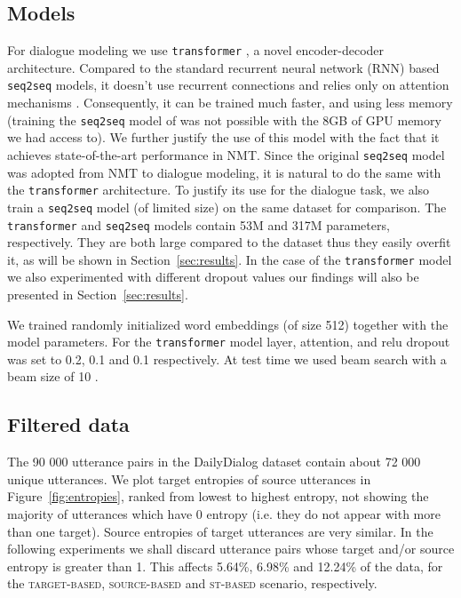 \documentclass[11pt,a4paper]{article}
\begin{document}
\subsection{Models}
For dialogue modeling we use \texttt{transformer} \cite{Vaswani:2017}, a novel
encoder-decoder architecture. Compared to the standard recurrent neural
network (RNN) based \texttt{seq2seq} models, it doesn't use recurrent connections
and relies only on attention mechanisms \cite{Bahdanau:2015}. Consequently, it can
be trained much faster, and using less memory (training the
\texttt{seq2seq}
model of \cite{Vinyals:2015d} was not possible with the 8GB of GPU
memory we had access to). We further justify the use of this model with the fact that it achieves
state-of-the-art performance in NMT. Since the original \texttt{seq2seq} model was
adopted from NMT \cite{Cho:2014} to dialogue modeling,
it is natural to do the same with the \texttt{transformer} architecture.
To justify its use for the dialogue task, we also train a
\texttt{seq2seq} model (of limited size) on the same dataset for comparison.
The \texttt{transformer} and \texttt{seq2seq} models contain 53M and 317M
parameters, respectively. They are both large compared to the dataset thus
they easily overfit it, as will be shown in Section~\ref{sec:results}.
In the case of the \texttt{transformer} model we also experimented with different
dropout \cite{Srivastava:2014a} values our findings will also be
presented in Section~\ref{sec:results}.

We trained randomly initialized word embeddings (of size 512) together with the model parameters. For the \texttt{transformer} model layer, attention, and relu dropout was set to 0.2, 0.1 and 0.1 respectively. At test time we used beam search with a beam size of 10 \cite{Graves:2012b}.

\subsection{Filtered data}
The 90 000 utterance pairs in the DailyDialog dataset contain about 72
000 unique utterances. We plot target entropies of source utterances in
Figure~\ref{fig:entropies}, ranked from lowest to highest entropy, not showing the majority of utterances which have 0 entropy (i.e. they do not appear with more than one target). Source entropies of target utterances are very similar. In the following
experiments we shall discard utterance pairs whose target and/or source entropy is greater
than 1. This affects 5.64\%, 6.98\% and 12.24\% of the data, for the \textsc{target-based}, \textsc{source-based} and \textsc{st-based} scenario, respectively.
\end{document}
